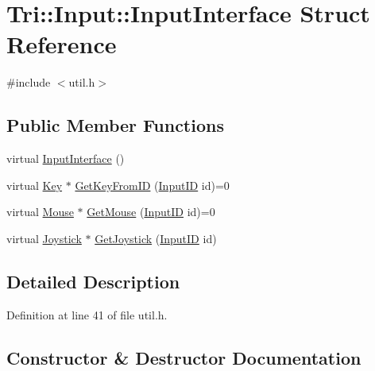 \hypertarget{struct_tri_1_1_input_1_1_input_interface}{}\section{Tri\+:\+:Input\+:\+:Input\+Interface Struct Reference}
\label{struct_tri_1_1_input_1_1_input_interface}


{\ttfamily \#include $<$util.\+h$>$}

\subsection*{Public Member Functions}
\begin{DoxyCompactItemize}
\item 
virtual \hyperlink{struct_tri_1_1_input_1_1_input_interface_a7e7ef1cdb89376ce9e85215474377fa2}{Input\+Interface} ()
\item 
virtual \hyperlink{struct_tri_1_1_input_1_1_key}{Key} $\ast$ \hyperlink{struct_tri_1_1_input_1_1_input_interface_aaf5dc0124e84c2fdaf937b3ffa0a41a8}{Get\+Key\+From\+I\+D} (\hyperlink{namespace_tri_1_1_input_ac94df02dceb9dbc5ca1512e9ded38154}{Input\+I\+D} id)=0
\item 
virtual \hyperlink{class_tri_1_1_input_1_1_mouse}{Mouse} $\ast$ \hyperlink{struct_tri_1_1_input_1_1_input_interface_ac35d9ee167463bd5f6c71da3f2003920}{Get\+Mouse} (\hyperlink{namespace_tri_1_1_input_ac94df02dceb9dbc5ca1512e9ded38154}{Input\+I\+D} id)=0
\item 
virtual \hyperlink{class_tri_1_1_input_1_1_joystick}{Joystick} $\ast$ \hyperlink{struct_tri_1_1_input_1_1_input_interface_ab4c2ce3648e3761089fe2f7ecf0b5a6e}{Get\+Joystick} (\hyperlink{namespace_tri_1_1_input_ac94df02dceb9dbc5ca1512e9ded38154}{Input\+I\+D} id)
\end{DoxyCompactItemize}


\subsection{Detailed Description}


Definition at line 41 of file util.\+h.



\subsection{Constructor \& Destructor Documentation}
\hypertarget{struct_tri_1_1_input_1_1_input_interface_a7e7ef1cdb89376ce9e85215474377fa2}{}
